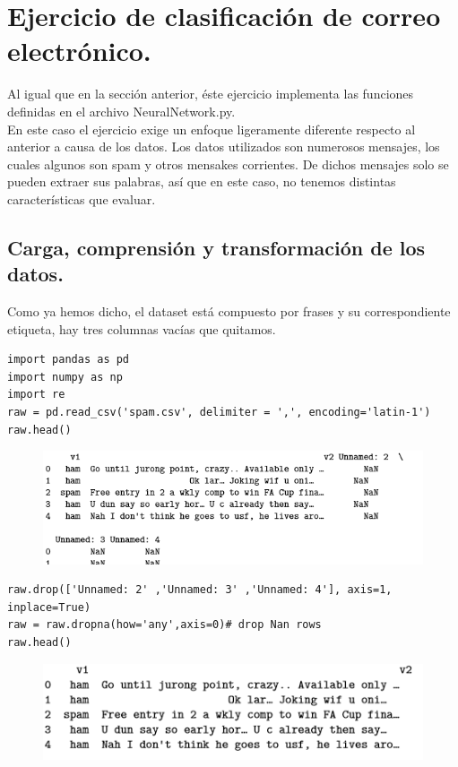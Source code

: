 \documentclass[a4paper,10pt]{article}
\begin{document}
\section{Ejercicio de clasificación de correo electrónico.}
Al igual que en la sección anterior, éste ejercicio implementa las funciones definidas en el archivo NeuralNetwork.py.\\ En este caso el ejercicio exige un enfoque ligeramente diferente respecto al anterior a causa de los datos. Los datos utilizados son numerosos mensajes, los cuales algunos son spam y otros mensakes corrientes. De dichos mensajes solo se pueden extraer sus palabras, así que en este caso, no tenemos distintas características que evaluar.
\subsection{Carga, comprensión y transformación de los datos.}
Como ya hemos dicho, el dataset está compuesto por frases y su correspondiente etiqueta, hay tres columnas vacías que quitamos.
\begin{lstlisting}
import pandas as pd
import numpy as np
import re
raw = pd.read_csv('spam.csv', delimiter = ',', encoding='latin-1')
raw.head()
\end{lstlisting}
\begin{figure}[H]
\centering
\includegraphics{Annotation 2020-03-23 174228.png}
\end{figure}
\begin{lstlisting}
raw.drop(['Unnamed: 2' ,'Unnamed: 3' ,'Unnamed: 4'], axis=1, inplace=True)
raw = raw.dropna(how='any',axis=0)# drop Nan rows
raw.head()
\end{lstlisting}
\begin{figure}[H]
\centering
\includegraphics{Annotation 2020-03-23 174341.png}
\end{figure}
\end{document}
